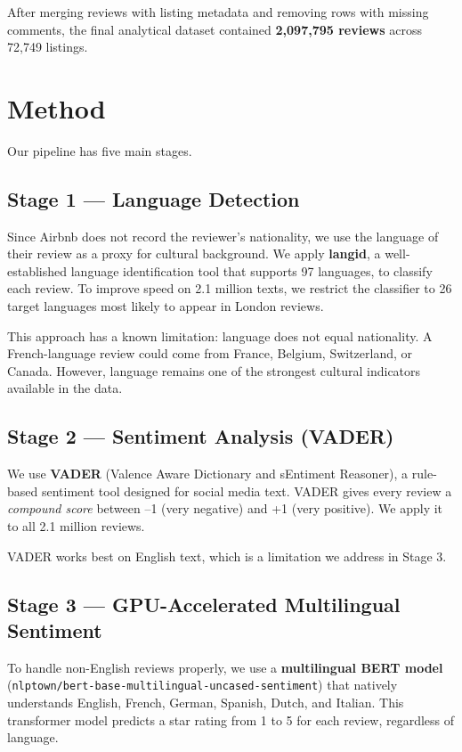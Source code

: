 \documentclass[12pt,a4paper]{article}
\begin{document}
After merging reviews with listing metadata and removing rows with missing comments, the final analytical dataset contained \textbf{2,097,795 reviews} across 72,749 listings.

\section{Method}

Our pipeline has five main stages.

\subsection{Stage 1 --- Language Detection}

Since Airbnb does not record the reviewer's nationality, we use the language of their review as a proxy for cultural background.
We apply \textbf{langid}, a well-established language identification tool that supports 97 languages, to classify each review.
To improve speed on 2.1 million texts, we restrict the classifier to 26 target languages most likely to appear in London reviews.

This approach has a known limitation: language does not equal nationality.
A French-language review could come from France, Belgium, Switzerland, or Canada.
However, language remains one of the strongest cultural indicators available in the data.

\subsection{Stage 2 --- Sentiment Analysis (VADER)}

We use \textbf{VADER} (Valence Aware Dictionary and sEntiment Reasoner), a rule-based sentiment tool designed for social media text.
VADER gives every review a \emph{compound score} between --1 (very negative) and +1 (very positive).
We apply it to all 2.1 million reviews.

VADER works best on English text, which is a limitation we address in Stage 3.

\subsection{Stage 3 --- GPU-Accelerated Multilingual Sentiment}

To handle non-English reviews properly, we use a \textbf{multilingual BERT model} (\texttt{nlptown/bert-base-multilingual-uncased-sentiment}) that natively understands English, French, German, Spanish, Dutch, and Italian.
This transformer model predicts a star rating from 1 to 5 for each review, regardless of language.
\end{document}
